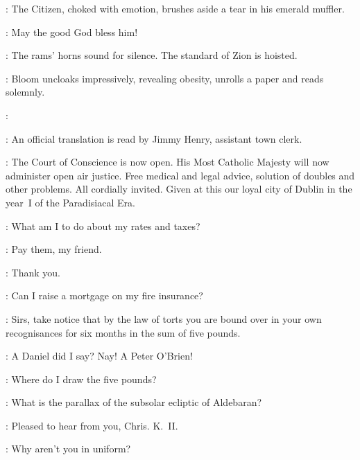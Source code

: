 :
The Citizen,
choked with emotion,
brushes aside a tear in his emerald muffler.

\Citizen:
May the good God bless him!

:
The rams' horns sound for silence.
The standard of Zion is hoisted.%

:
Bloom uncloaks impressively,
revealing obesity,
unrolls a paper and reads solemnly.

\Bloom:

:
An official translation is read by Jimmy Henry,
assistant town clerk.

\JimmyHenry:
The Court of Conscience is now open.
His Most Catholic Majesty will now administer open air justice.
Free medical and legal advice,
solution of doubles and other problems.
All cordially invited.
Given at this our loyal city of Dublin in the year~I of the Paradisiacal Era.

\PaddyLeonard[1]:
What am I to do about my rates and taxes?

\Bloom:
Pay them,
my friend.

\PaddyLeonard[1]:
Thank you.

\NoseyFlynn[2]:
Can I raise a mortgage on my fire insurance?%

\Bloom:
Sirs,
take notice that by the law of torts you are bound over
in your own recognisances for six months in the sum of five pounds.

\JJOM[1]:
A Daniel did I say?
Nay!
A Peter O'Brien!

\NoseyFlynn[2]:
Where do I draw the five pounds?

%

\ChrisCallinan[1]:
What is the parallax of the subsolar ecliptic of Aldebaran?

\Bloom:
Pleased to hear from you,
Chris.
K.~II.

\JoeHynes[2]:
Why aren't you in uniform?%

